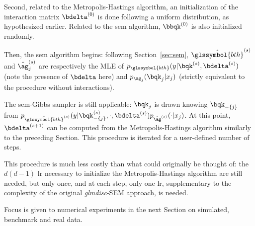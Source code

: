 Second, related to the Metropolis-Hastings algorithm, an initialization of the interaction matrix $\bdelta^{(0)}$ is done following a uniform distribution, as hypothesized earlier. Related to the \gls{sem} algorithm, $\bbqk^{(0)}$ is also initialized randomly.

Then, the \gls{sem} algorithm begins: following Section~\ref{sec:sem}, $\hat{\glssymbol{bth}}^{(s)}$ and $\hat{\ag}_j^{(s)}$ are respectively the MLE of $p_{\glssymbol{bth}}(y | \bqk^{(s)}, \bdelta^{(s)})$ (note the presence of $\bdelta$ here) and $p_{\ag_j}(\bqk_j | x_j)$ (strictly equivalent to the procedure without interactions).

The \gls{sem}-Gibbs sampler is still applicable: $\bqk_j$ is drawn knowing $\bqk_{-\{j\}}$ from $p_{\hat{\glssymbol{bth}}^{(s)}}(y | \bqk_{-\{j\}}^{(s)}, \cdot, \bdelta^{(s)}) p_{\hat{\ag}^{(s)}}(\cdot | x_j)$. At this point, $\bdelta^{(s+1)}$ can be computed from the Metropolis-Hastings algorithm similarly to the preceding Section. This procedure is iterated for a user-defined number of steps.

This procedure is much less costly than what could originally be thought of: the $d(d-1)$ \gls{lr} necessary to initialize the Metropolis-Hastings algorithm are still needed, but only once, and at each step, only one \gls{lr}, supplementary to the complexity of the original \textit{glmdisc}-SEM approach, is needed.

Focus is given to numerical experiments in the next Section on simulated, benchmark and real data.

%
%
%
%
%
%
%
%
%
%
%
%
%




